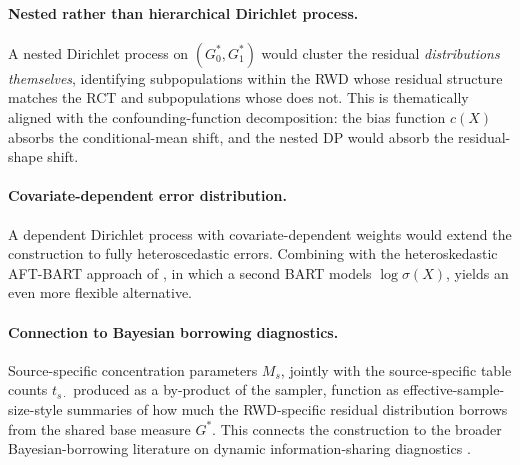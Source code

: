 \documentclass[11pt]{article}
\theoremstyle{plain}
\theoremstyle{definition}
\theoremstyle{remark}
\newcommand{\1}{\mathds{1}}
\begin{document}
\paragraph{Nested rather than hierarchical Dirichlet process.} A nested Dirichlet process \citep{rodriguez2008nested} on $(G_0^*, G_1^*)$ would cluster the residual \emph{distributions themselves}, identifying subpopulations within the RWD whose residual structure matches the RCT and subpopulations whose does not. This is thematically aligned with the confounding-function decomposition: the bias function $c(X)$ absorbs the conditional-mean shift, and the nested DP would absorb the residual-shape shift.

\paragraph{Covariate-dependent error distribution.} A dependent Dirichlet process \citep{maceachern1999dependent} with covariate-dependent weights would extend the construction to fully heteroscedastic errors. Combining with the heteroskedastic AFT-BART approach of \citet{sparapani2023nonparametric}, in which a second BART models $\log \sigma(X)$, yields an even more flexible alternative.

\paragraph{Connection to Bayesian borrowing diagnostics.} Source-specific concentration parameters $M_s$, jointly with the source-specific table counts $t_{s\cdot}$ produced as a by-product of the sampler, function as effective-sample-size-style summaries of how much the RWD-specific residual distribution borrows from the shared base measure $G^*$. This connects the construction to the broader Bayesian-borrowing literature on dynamic information-sharing diagnostics \citep{hupf2021bayesian}.



\end{document}
